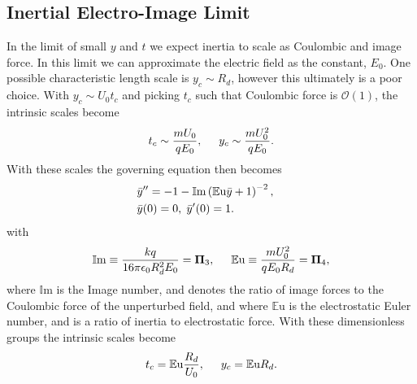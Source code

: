 \documentclass[12pt,a4paper,oneside]{book}
\begin{document}
\subsection{Inertial Electro-Image Limit}
In the limit of small $y$ and $t$ we expect inertia to scale as Coulombic and image force. In this limit we can approximate the electric field as the constant, $E_0$. One possible characteristic length scale is $y_c \sim R_d$, however this ultimately is a poor choice. With $y_c \sim U_0 t_c$ and picking $t_c$ such that Coulombic force is $\mathcal{O}(1)$, the intrinsic scales become
\[ t_c \sim \frac{m U_0}{q E_0}, \hspace{5 mm}
y_c \sim \frac{m U_0^2}{q E_0} .
\]
With these scales the governing equation then becomes
\begin{eqnarray}
& \bar{y}'' = -1 - \mathbb{I}\mbox{m} \left( \mathbb{E}\mbox{u}\bar{y} + 1 \right)^{-2} ,& \nonumber \\
& \bar{y}(0) = 0, \hspace{1 mm} \bar{y}'(0) = 1 .& \label{img_limit}
\end{eqnarray} 
with 
\[ \mathbb{I}\mbox{m} \equiv \frac{k q}{16 \pi \epsilon_0 R_d^2 E_0} = \mathbf{\Pi}_3, \hspace{5 mm}
\mathbb{E}\mbox{u} \equiv \frac{m U_0^2}{q E_0 R_d} = \mathbf{\Pi}_4 ,
\]
where $\mathbb{I}\mbox{m}$ is the Image number, and denotes the ratio of image forces to the Coulombic force of the unperturbed field, and where $\mathbb{E}\mbox{u}$ is the electrostatic Euler number, and is a ratio of inertia to electrostatic force. With these dimensionless groups the intrinsic scales become
\[ t_c = \mathbb{E}\mbox{u} \frac{R_d}{U_0}, \hspace{5 mm}
y_c = \mathbb{E}\mbox{u} R_d.
\]
\end{document}
